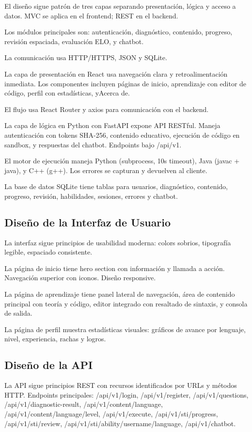 \documentclass[12pt,letterpaper]{article}
\begin{document}
El diseño sigue patrón de tres capas separando presentación, lógica y acceso a datos. MVC se aplica en el frontend; REST en el backend.

Los módulos principales son: autenticación, diagnóstico, contenido, progreso, revisión espaciada, evaluación ELO, y chatbot.

La comunicación usa HTTP/HTTPS, JSON y SQLite.

La capa de presentación en React usa navegación clara y retroalimentación inmediata. Los componentes incluyen páginas de inicio, aprendizaje con editor de código, perfil con estadísticas, yAcerca de.

El flujo usa React Router y axios para comunicación con el backend.

La capa de lógica en Python con FastAPI expone API RESTful. Maneja autenticación con tokens SHA-256, contenido educativo, ejecución de código en sandbox, y respuestas del chatbot. Endpoints bajo /api/v1.

El motor de ejecución maneja Python (subprocess, 10s timeout), Java (javac + java), y C++ (g++). Los errores se capturan y devuelven al cliente.

La base de datos SQLite tiene tablas para usuarios, diagnóstico, contenido, progreso, revisión, habilidades, sesiones, errores y chatbot.

\subsection{Diseño de la Interfaz de Usuario}

La interfaz sigue principios de usabilidad moderna: colors sobrios, tipografía legible, espaciado consistente.

La página de inicio tiene hero section con información y llamada a acción. Navegación superior con iconos. Diseño responsive.

La página de aprendizaje tiene panel lateral de navegación, área de contenido principal con teoría y código, editor integrado con resaltado de sintaxis, y consola de salida.

La página de perfil muestra estadísticas visuales: gráficos de avance por lenguaje, nivel, experiencia, rachas y logros.

\subsection{Diseño de la API}

La API sigue principios REST con recursos identificados por URLs y métodos HTTP. Endpoints principales: /api/v1/login, /api/v1/register, /api/v1/questions, /api/v1/diagnostic-result, /api/v1/content/{language}, /api/v1/content/{language}/{level}, /api/v1/execute, /api/v1/sti/progress, /api/v1/sti/review, /api/v1/sti/ability/{username}/{language}, /api/v1/chatbot.
\end{document}
